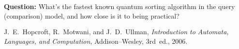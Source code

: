 \documentclass[12pt]{article}
\begin{document}
\textbf{Question:} What’s the fastest known quantum sorting algorithm in the query (comparison) model, and how close is it to being practical?

\begin{thebibliography}{9}
    J.~E.~Hopcroft, R.~Motwani, and J.~D.~Ullman,
    \textit{Introduction to Automata, Languages, and Computation},
    Addison–Wesley, 3rd~ed., 2006.
\end{thebibliography}
\end{document}
